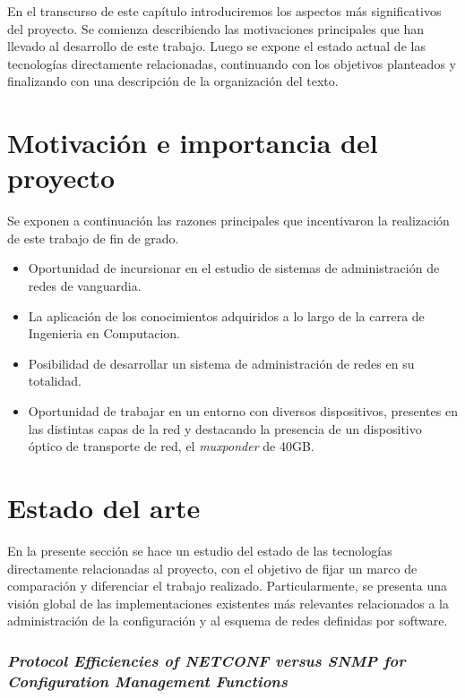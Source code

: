 En el transcurso de este capítulo introduciremos los aspectos más significativos del proyecto. Se comienza describiendo las motivaciones principales que han llevado al desarrollo de este trabajo. Luego se expone el estado actual de las tecnologías directamente relacionadas, continuando con los objetivos planteados y finalizando con una descripción de la organización del texto.

\section{Motivación e importancia del proyecto}

Se exponen a continuación las razones principales que incentivaron la realización de este trabajo de fin de grado.

\begin{itemize}     
    \item Oportunidad de incursionar en el estudio de sistemas de administración de redes de vanguardia.
    \item La aplicación de los conocimientos adquiridos a lo largo de la carrera de Ingenieria en Computacion.
    \item Posibilidad de desarrollar un sistema de administración de redes en su totalidad.
    \item Oportunidad de trabajar en un entorno con diversos dispositivos, presentes en las distintas capas de la red y destacando la presencia de un dispositivo óptico de transporte de red, el \textit{muxponder} de 40GB.
\end{itemize}
    
\section{Estado del arte} \label{Estado_Arte} %

En la presente sección se hace un estudio del estado de las tecnologías directamente relacionadas al proyecto, con el objetivo de fijar un marco de comparación y diferenciar el trabajo realizado. Particularmente, se presenta una visión global de las implementaciones existentes más relevantes relacionados a la administración de la configuración y al esquema de redes definidas por software.



\subsubsection*{\textit{Protocol Efficiencies of NETCONF versus SNMP for Configuration Management Functions}}


